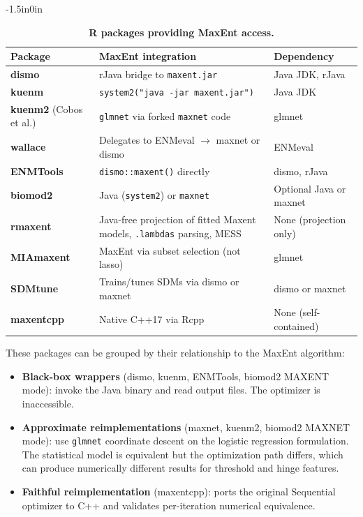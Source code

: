 \documentclass[10pt,letterpaper]{article}
\begin{document}
\begin{table}[!ht]
\begin{adjustwidth}{-1.5in}{0in}
\centering
\caption{{\bf R packages providing MaxEnt access.}}
\begin{tabular}{|l|l|l|}
\hline
\textbf{Package} & \textbf{MaxEnt integration} & \textbf{Dependency} \\
\hline
\textbf{dismo}~\cite{Hijmans2023}
  & rJava bridge to \texttt{maxent.jar} & Java JDK, rJava \\
\hline
\textbf{kuenm}~\cite{Cobos2019}
  & \texttt{system2("java -jar maxent.jar")} & Java JDK \\
\hline
\textbf{kuenm2} (Cobos et al.)
  & \texttt{glmnet} via forked \texttt{maxnet} code & glmnet \\
\hline
\textbf{wallace}~\cite{Kass2018wallace}
  & Delegates to ENMeval $\to$ maxnet or dismo & ENMeval \\
\hline
\textbf{ENMTools}~\cite{Warren2010}
  & \texttt{dismo::maxent()} directly & dismo, rJava \\
\hline
\textbf{biomod2}~\cite{Thuiller2009}
  & Java (\texttt{system2}) or \texttt{maxnet} & Optional Java or maxnet \\
\hline
\textbf{rmaxent}~\cite{Baumgartner2017}
  & Java-free projection of fitted Maxent models, \texttt{.lambdas} parsing, MESS & None (projection only) \\
\hline
\textbf{MIAmaxent}~\cite{Vollering2019}
  & MaxEnt via subset selection (not lasso) & glmnet \\
\hline
\textbf{SDMtune}~\cite{Vignali2020}
  & Trains/tunes SDMs via dismo or maxnet & dismo or maxnet \\
\hline
\textbf{maxentcpp}
  & Native C++17 via Rcpp & None (self-contained) \\
\hline
\end{tabular}
\label{tab:ecosystem}
\end{adjustwidth}
\end{table}

These packages can be grouped by their relationship to the MaxEnt
algorithm:

\begin{itemize}[nosep,leftmargin=*]
  \item \textbf{Black-box wrappers} (dismo, kuenm, ENMTools, biomod2
    MAXENT mode): invoke the Java binary and read output files.
    The optimizer is inaccessible.
  \item \textbf{Approximate reimplementations} (maxnet, kuenm2, biomod2
    MAXNET mode): use \texttt{glmnet} coordinate descent on the logistic
    regression formulation.
    The statistical model is equivalent but the optimization path
    differs, which can produce numerically different results for
    threshold and hinge features.
  \item \textbf{Faithful reimplementation} (maxentcpp): ports the
    original Sequential optimizer to C++ and validates per-iteration
    numerical equivalence.
\end{itemize}
\end{document}
